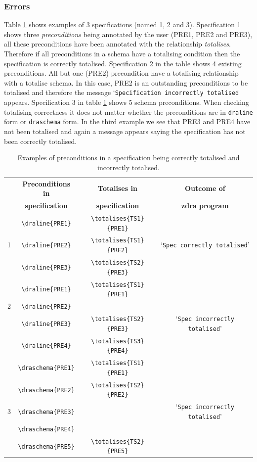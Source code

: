 \subsubsection{Errors}
\label{subsubsec:zdra_toterrors}

Table \ref{tab:totalisecorrect} shows examples of 3 specifications (named 1, 2
and 3). Specification 1 shows three \emph{preconditions} being annotated by the
user (PRE1, PRE2 and PRE3), all these preconditions have been annotated with the
relationship \emph{totalises}. Therefore if all preconditions in a schema have a
totalising condition then the specification is correctly totalised.
Specification 2 in the table shows 4 existing preconditions. All but one (PRE2)
precondition have a totalising relationship with a totalise schema. In this
case, PRE2 is an outstanding preconditions to be totalised and therefore the
message `\texttt{Specification incorrectly totalised} appears. Specification 3 in
table \ref{tab:totalisecorrect} shows 5 schema preconditions. When checking
totalising correctness it does not matter whether the preconditions are in
\verb|draline| form or \verb|draschema| form. In the third example we see that
PRE3 and PRE4 have not been totalised and again a message appears saying the
specification has not been correctly totalised.

\begin{table}[H]
\begin{tabular}{|c|c|c|c|}
\hline
& \textbf{Preconditions in} & \textbf{Totalises in} & \textbf{Outcome of} \\
& \textbf{specification} & \textbf{specification} & \textbf{\gls{zdra} program}
\\
\hline
\hline
& \verb|\draline{PRE1}| & \verb|\totalises{TS1}{PRE1}| & \\
1 & \verb|\draline{PRE2}| & \verb|\totalises{TS1}{PRE2}| & `\texttt{Spec
correctly totalised}' \\
& \verb|\draline{PRE3}| & \verb|\totalises{TS2}{PRE3}|& \\
\hline
& \verb|\draline{PRE1}| & \verb|\totalises{TS1}{PRE1}| &  \\
2 & \verb|\draline{PRE2}| & & \\
& \verb|\draline{PRE3}| & \verb|\totalises{TS2}{PRE3}|& `\texttt{Spec
incorrectly totalised}' \\
& \verb|\draline{PRE4}| & \verb|\totalises{TS3}{PRE4}|& \\
\hline
& \verb|\draschema{PRE1}| & \verb|\totalises{TS1}{PRE1}| &  \\
 & \verb|\draschema{PRE2}| & \verb|\totalises{TS2}{PRE2}| & \\
3 & \verb|\draschema{PRE3}| & & `\texttt{Spec incorrectly totalised}' \\
& \verb|\draschema{PRE4}| & & \\
& \verb|\draschema{PRE5}| & \verb|\totalises{TS2}{PRE5}|  & \\
\hline
\end{tabular}
\caption{\label{tab:totalisecorrect} Examples of preconditions in a specification being correctly totalised and incorrectly totalised.}
\end{table}

